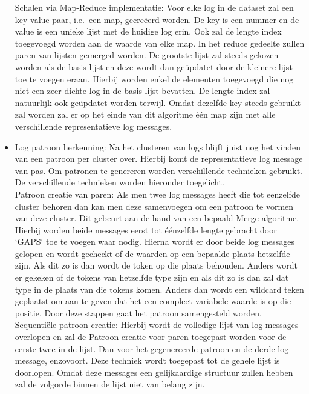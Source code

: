 \begin{itemize}
    \subitem Schalen via Map-Reduce implementatie: Voor elke log in de dataset zal een key-value paar, i.e.\ een map, gecreëerd worden. De key is een nummer en de value is een unieke lijst met de huidige log erin. Ook zal de lengte index toegevoegd worden aan de waarde van elke map. In het reduce gedeelte zullen paren van lijsten gemerged worden. De grootste lijst zal steeds gekozen worden als de basis lijst en deze wordt dan geüpdatet door de kleinere lijst toe te voegen eraan. Hierbij worden enkel de elementen toegevoegd die nog niet een zeer dichte log in de basis lijst bevatten. De lengte index zal natuurlijk ook geüpdatet worden terwijl. Omdat dezelfde key steeds gebruikt zal worden zal er op het einde van dit algoritme één map zijn met alle verschillende representatieve log messages. \\
    
    \item Log patroon herkenning: Na het clusteren van logs blijft juist nog het vinden van een patroon per cluster over. Hierbij komt de representatieve log message van pas. Om patronen te genereren worden verschillende technieken gebruikt. De verschillende technieken worden hieronder toegelicht.\\
    
    \subitem Patroon creatie van paren: Als men twee log messages heeft die tot eenzelfde cluster behoren dan kan men deze samenvoegen om een patroon te vormen van deze cluster. Dit gebeurt aan de hand van een bepaald Merge algoritme. Hierbij worden beide messages eerst tot éénzelfde lengte gebracht door `GAPS` toe te voegen waar nodig. Hierna wordt er door beide log messages gelopen en wordt gecheckt of de waarden op een bepaalde plaats hetzelfde zijn. Als dit zo is dan wordt de token op die plaats behouden. Anders wordt er gekeken of de tokens van hetzelfde type zijn en als dit zo is dan zal dat type in de plaats van die tokens komen. Anders dan wordt een wildcard teken geplaatst om aan te geven dat het een compleet variabele waarde is op die positie. Door deze stappen gaat het patroon samengesteld worden.\\
    
    \subitem Sequentiële patroon creatie: Hierbij wordt de volledige lijst van log messages overlopen en zal de Patroon creatie voor paren toegepast worden voor de eerste twee in de lijst. Dan voor het gegenereerde patroon en de derde log message, enzovoort. Deze techniek wordt toegepast tot de gehele lijst is doorlopen. Omdat deze messages een gelijkaardige structuur zullen hebben zal de volgorde binnen de lijst niet van belang zijn.\\
    

\end{itemize}
